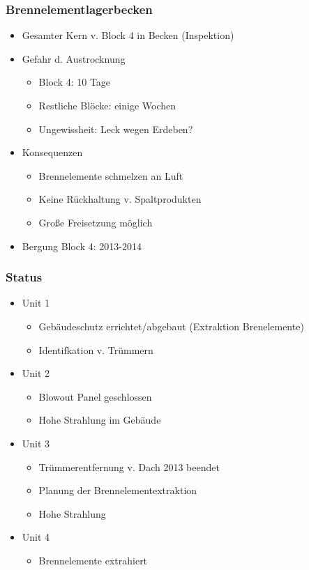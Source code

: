 \documentclass[12pt]{article}
\begin{document}
\subsubsection{Brennelementlagerbecken}
\begin{itemize}
  \item Gesamter Kern v. Block 4 in Becken (Inspektion)
  \item Gefahr d. Austrocknung
  \begin{itemize}
    \item Block 4: 10 Tage
    \item Restliche Blöcke: einige Wochen
    \item Ungewissheit: Leck wegen Erdeben?
  \end{itemize}
  \item Konsequenzen
  \begin{itemize}
    \item Brennelemente schmelzen an Luft
    \item Keine Rückhaltung v. Spaltprodukten
    \item Große Freisetzung möglich
  \end{itemize}
  \item Bergung Block 4: 2013-2014
\end{itemize}

\subsubsection{Status}
\begin{itemize}
  \item Unit 1
  \begin{itemize}
    \item Gebäudeschutz errichtet/abgebaut (Extraktion Brenelemente)
    \item Identifkation v. Trümmern
  \end{itemize}
  \item Unit 2
  \begin{itemize}
    \item Blowout Panel geschlossen
    \item Hohe Strahlung im Gebäude
  \end{itemize}
  \item Unit 3
  \begin{itemize}
    \item Trümmerentfernung v. Dach 2013 beendet
    \item Planung der Brennelementextraktion
    \item Hohe Strahlung
  \end{itemize}
  \item Unit 4
  \begin{itemize}
    \item Brennelemente extrahiert
  \end{itemize}
\end{itemize}
\end{document}
